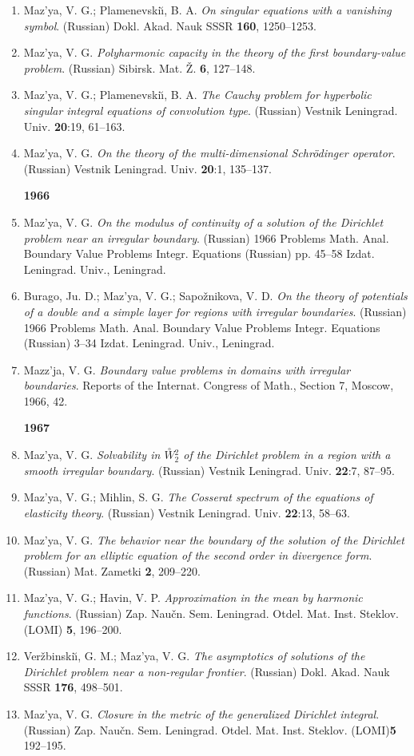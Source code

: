 \documentclass{article}
\begin{document}
\begin{enumerate}
{\bf 1965}
\item Maz'ya, V. G.; Plamenevski{\u\i}, B. A. {\it On singular
equations
with a vanishing symbol}.
(Russian) Dokl. Akad. Nauk SSSR {\bf 160}, 1250--1253.
\item Maz'ya, V. G. {\it Polyharmonic capacity in the theory of the
first
boundary-value problem}.
(Russian) Sibirsk. Mat. \v Z. {\bf 6}, 127--148.
\item Maz'ya, V. G.; Plamenevski{\u\i}, B. A. {\it The Cauchy problem
for
hyperbolic singular integral equations
of convolution type}. (Russian) Vestnik Leningrad. Univ. {\bf 20}:19,
61--163.
\item Maz'ya, V. G. {\it On the theory of the multi-dimensional
Schr\"odinger operator}. (Russian) Vestnik Leningrad.
Univ. {\bf 20}:1, 135--137.\hfill\break

{\bf 1966}
\item Maz'ya, V. G. {\it On the modulus of continuity of a solution of
the
Dirichlet problem near an
irregular boundary}.  (Russian) 1966 Problems Math. Anal. Boundary
Value
Problems Integr. Equations (Russian) pp. 45--58 Izdat.
Leningrad. Univ., Leningrad.
\item Burago, Ju. D.; Maz'ya, V. G.; Sapo\v znikova, V. D. {\it On the
theory of potentials of a double and a simple
layer for regions with irregular boundaries}. (Russian) 1966 Problems
Math.
Anal. Boundary Value Problems Integr. Equations
(Russian) 3--34 Izdat. Leningrad. Univ., Leningrad.
\item Mazz'ja, V. G. {\it Boundary value problems in domains with
irregular
boundaries}. Reports of the Internat. Congress of Math.,
Section 7, Moscow, 1966, 42.\hfill\break

{\bf 1967}
\item Maz'ya, V. G. {\it Solvability in
$\stackrel{\circ}{W}\!\!{}^2_2$ of
the Dirichlet problem in a region with a smooth irregular boundary}.
(Russian) Vestnik Leningrad. Univ. {\bf 22}:7, 87--95.
\item Maz'ya, V. G.; Mihlin, S. G. {\it The Cosserat spectrum of the
equations of elasticity theory}.
(Russian) Vestnik Leningrad. Univ. {\bf 22}:13, 58--63.
\item Maz'ya, V. G. {\it The behavior near the boundary of the
solution of
the Dirichlet problem for an
elliptic equation of the second order in divergence form}. (Russian)
Mat.
Zametki {\bf 2}, 209--220.
\item Maz'ya, V. G.; Havin, V. P. {\it Approximation in the mean by
harmonic functions}.
(Russian) Zap. Nau\v cn. Sem. Leningrad. Otdel. Mat. Inst. Steklov.
(LOMI)
{\bf 5}, 196--200.
\item Ver\v zbinski{\u\i}, G. M.; Maz'ya, V. G. {\it The asymptotics
of
solutions of the Dirichlet problem
near a non-regular frontier}. (Russian) Dokl. Akad. Nauk SSSR {\bf
176},
498--501.
\item Maz'ya, V. G. {\it Closure in the metric of the generalized
Dirichlet
integral}. (Russian) Zap. Nau\v cn. Sem.
Leningrad. Otdel. Mat. Inst. Steklov. (LOMI){\bf 5}
192--195.\hfill\break


\end{enumerate}
\end{document}
